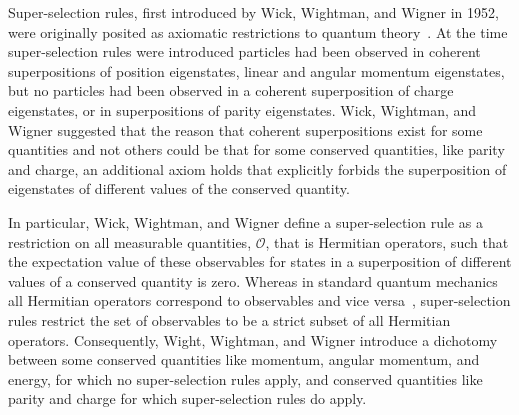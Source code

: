 \documentclass{article}
\begin{document}
%
%
% 
 
Super-selection rules, first introduced by Wick, Wightman, and Wigner in 1952,  were originally posited as axiomatic restrictions to quantum theory~\cite{WWW52}.  At the time super-selection rules were introduced particles had been observed in coherent superpositions of position eigenstates, linear and angular momentum eigenstates, but no particles had been observed in a coherent superposition of charge eigenstates, or  in superpositions of parity eigenstates.  Wick, Wightman, and Wigner suggested that the reason that coherent superpositions exist for some quantities and not others could be that for some conserved quantities, like parity and charge, an additional axiom holds that explicitly forbids the superposition of eigenstates of different values of the conserved quantity.  

In particular, Wick, Wightman, and Wigner define a super-selection rule as a restriction on all measurable quantities, $\mathcal{O}$, that is Hermitian operators, such that the expectation value of these observables for states in a superposition of different values of a conserved quantity is zero.  Whereas in standard quantum mechanics all Hermitian operators correspond to observables and vice versa~\cite{vN55}, super-selection rules restrict the set of observables to be a strict subset of all Hermitian operators.  Consequently, Wight, Wightman, and Wigner introduce a dichotomy between 
some conserved quantities like momentum, angular momentum, and energy, for which no super-selection rules apply,  and conserved quantities like parity and charge for which super-selection rules do apply.  
\end{document}
